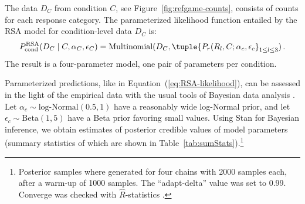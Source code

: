 \documentclass[fleqn]{article}
\begin{document}
The data $D_{C}$ from condition $C$, see Figure~\ref{fig:refgame-counts}, consists of counts for each response category.
The parameterized likelihood function entailed by the RSA model for condition-level data $D_{C}$ is:
%
\begin{align}
  \label{eq:RSA-likelihood}
 P^{\text{RSA}}_{\text{cond}}(D_{C} \mid C, \alpha_{C}, \epsilon_{C}) = \text{Multinomial}(D_{C}, \tuple{P_{r}(R_{l}, C; \alpha_{c}, \epsilon_{c}}_{1 \le l \le 3})\,.
\end{align}
%
The result is a four-parameter model, one pair of parameters per condition.

Parameterized predictions, like in Equation~(\ref{eq:RSA-likelihood}), can be assessed in the light of the empirical data with the usual tools of Bayesian data analysis \citep[e.g.][]{GelmanCarlin2014:Bayesian-Data-A,McElreath2016:Statistical-Ret,Lambert2018:A-Students-Guid}.
Let $\alpha_{c}\sim \text{log-Normal}(0.5,1)$ have a reasonably wide log-Normal prior, and let $\epsilon_{c} \sim \text{Beta}(1,5)$ have a Beta prior favoring small values.
Using Stan \citep{Team2023:The-Stan-Core-L} for Bayesian inference, we obtain estimates of posterior credible values of model parameters (summary statistics of which are shown in Table~\ref{tab:sumStats}).\footnote{
  Posterior samples where generated for four chains with 2000 samples each, after a warm-up of 1000 samples. The ``adapt-delta'' value was set to 0.99. Converge was checked with $\hat{R}$-statistics \citep{GelmanRubin1992:Inference-from-}.
}
\end{document}
